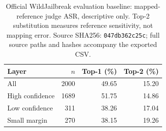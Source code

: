 \begin{table}[t]
\centering\small
\begin{tabular}{lrrr}
\toprule
Layer & $n$ & Top-1 (\%) & Top-2 (\%) \\
\midrule
All & 2000 & 49.65 & 15.20 \\
High confidence & 1689 & 51.75 & 14.86 \\
Low confidence & 311 & 38.26 & 17.04 \\
Small margin & 270 & 38.15 & 19.26 \\
\bottomrule
\end{tabular}
\caption{Official WildJailbreak evaluation baseline: mapped-reference judge ASR, descriptive only. Top-2 substitution measures reference sensitivity, not mapping error. Source SHA256: \texttt{047db362c25c}; full source paths and hashes accompany the exported CSV.}
\label{tab:wjb-official-mapping}
\end{table}
